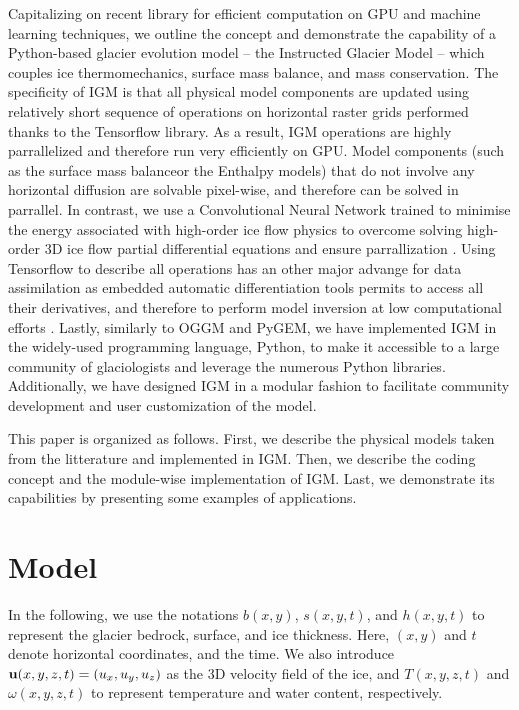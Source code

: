 \documentclass[10pt,twocolumn]{article}
\begin{document}
Capitalizing on recent library for efficient computation on GPU and machine learning
techniques, we outline the concept and demonstrate the capability of a Python-based
glacier evolution model -- the Instructed Glacier Model \citep[IGM,][]{jouvet2022deep} -- 
which couples ice thermomechanics, surface mass balance, and mass conservation. 
The specificity of IGM is that all physical model components are updated using relatively short 
sequence of operations on horizontal raster grids performed thanks to the Tensorflow library. 
As a result, IGM operations are highly parrallelized and therefore run very efficiently on GPU. 
Model components (such as the surface mass balanceor the Enthalpy models) 
that do not involve any horizontal 
diffusion are solvable pixel-wise, and therefore can be solved in parrallel. 
In contrast, we use a Convolutional Neural Network trained to minimise the energy associated 
with high-order ice flow physics to overcome solving high-order 3D ice flow partial differential 
equations and ensure parrallization \citep{jouvet2023ice}.
Using Tensorflow to describe all operations has an other major advange for data assimilation 
as embedded automatic differentiation tools permits to access all their derivatives, and therefore
to perform model inversion at low computational efforts \citep{jouvet2023inversion}. Lastly,
similarly to OGGM and PyGEM, 
we have implemented IGM in the widely-used programming language, Python, to make it accessible 
to a large community of glaciologists and leverage the numerous Python libraries. 
Additionally, we have designed IGM in a modular fashion to facilitate community development and 
user customization of the model.

This paper is organized as follows. First, we describe the physical models taken from the 
litterature and implemented in IGM. 
Then, we describe the coding concept and the module-wise implementation of IGM.
Last, we demonstrate its capabilities by presenting some examples of applications.
 
 
 
\section{Model}   

In the following, we use the notations $b(x,y)$, $s(x,y,t)$, and $h(x,y,t)$ 
to represent the glacier bedrock, surface, and ice thickness. 
Here, $(x,y)$ and $t$ denote horizontal coordinates, and the time. 
We also introduce ${\bf u}(x,y,z,t) = (u_x,u_y,u_z)$ as the 3D velocity field of the ice, 
and $T(x, y, z, t)$ and $\omega(x,y,z,t)$ to represent temperature and water content, 
respectively.
\end{document}
